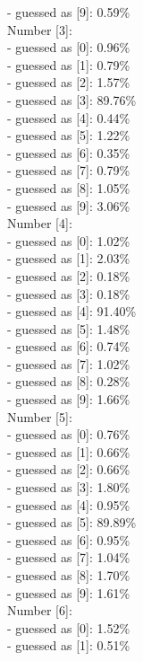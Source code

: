 {- guessed as [9]: 0.59\%\\
\newline
Number [3]:\\
- guessed as [0]: 0.96\%\\
- guessed as [1]: 0.79\%\\
- guessed as [2]: 1.57\%\\
- guessed as [3]: 89.76\%\\
- guessed as [4]: 0.44\%\\
- guessed as [5]: 1.22\%\\
- guessed as [6]: 0.35\%\\
- guessed as [7]: 0.79\%\\
- guessed as [8]: 1.05\%\\
- guessed as [9]: 3.06\%\\
\newline
Number [4]:\\
- guessed as [0]: 1.02\%\\
- guessed as [1]: 2.03\%\\
- guessed as [2]: 0.18\%\\
- guessed as [3]: 0.18\%\\
- guessed as [4]: 91.40\%\\
- guessed as [5]: 1.48\%\\
- guessed as [6]: 0.74\%\\
- guessed as [7]: 1.02\%\\
- guessed as [8]: 0.28\%\\
- guessed as [9]: 1.66\%\\
\newline
Number [5]:\\
- guessed as [0]: 0.76\%\\
- guessed as [1]: 0.66\%\\
- guessed as [2]: 0.66\%\\
- guessed as [3]: 1.80\%\\
- guessed as [4]: 0.95\%\\
- guessed as [5]: 89.89\%\\
- guessed as [6]: 0.95\%\\
- guessed as [7]: 1.04\%\\
- guessed as [8]: 1.70\%\\
- guessed as [9]: 1.61\%\\
\newline
Number [6]:\\
- guessed as [0]: 1.52\%\\
- guessed as [1]: 0.51\%\\
}
